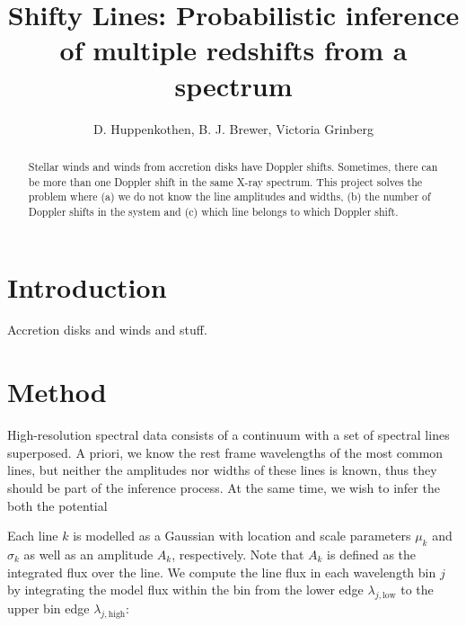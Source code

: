 \documentclass[12pt]{emulateapj}
\begin{document}
\title{Shifty Lines: Probabilistic inference of multiple redshifts from a spectrum}

\author{D. Huppenkothen, B. J. Brewer, Victoria Grinberg}
 


\begin{abstract}
Stellar winds and winds from accretion disks have Doppler shifts. Sometimes, there can be more than one Doppler shift in 
the same X-ray spectrum. This project solves the problem where (a) we do not know the line amplitudes and widths, (b) the 
number of Doppler shifts in the system and (c) which line belongs to which Doppler shift.

\end{abstract}


\section{Introduction}

Accretion disks and winds and stuff.

\section{Method}

High-resolution spectral data consists of a continuum with a set of spectral lines superposed. A priori, we know the rest frame wavelengths of the most common lines, but neither the amplitudes nor widths of these lines is known, thus they should be part of the inference process. At the same time, we wish to infer the both the potential 

Each line $k$ is modelled as a Gaussian with location and scale parameters $\mu_k$ and $\sigma_k$ as well as an amplitude $A_k$, respectively. Note that $A_k$ is defined as the integrated flux over the line. We compute the line flux in each wavelength bin $j$ by integrating the model flux within the bin from the lower edge $\lambda_{j, \mathrm{low}}$ to the upper bin edge $\lambda_{j, \mathrm{high}}$:
\end{document}
